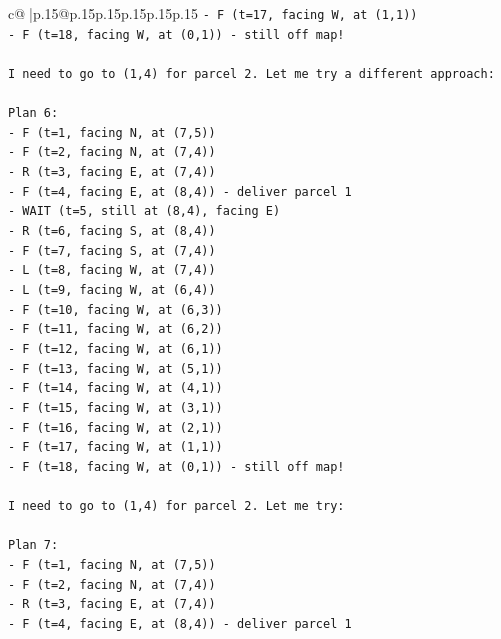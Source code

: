 \documentclass{article}
\begin{document}
{\begin{supertabular}{c@{$\;$}|p{.15\linewidth}@{}p{.15\linewidth}p{.15\linewidth}p{.15\linewidth}p{.15\linewidth}p{.15\linewidth}}
{{{\texttt{{-} F (t=17, facing W, at (1,1))} \\
\texttt{{-} F (t=18, facing W, at (0,1)) {-} still off map!} \\
\\ 
\texttt{I need to go to (1,4) for parcel 2. Let me try a different approach:} \\
\\ 
\texttt{Plan 6:} \\
\texttt{{-} F (t=1, facing N, at (7,5))} \\
\texttt{{-} F (t=2, facing N, at (7,4))} \\
\texttt{{-} R (t=3, facing E, at (7,4))} \\
\texttt{{-} F (t=4, facing E, at (8,4)) {-} deliver parcel 1} \\
\texttt{{-} WAIT (t=5, still at (8,4), facing E)} \\
\texttt{{-} R (t=6, facing S, at (8,4))} \\
\texttt{{-} F (t=7, facing S, at (7,4))} \\
\texttt{{-} L (t=8, facing W, at (7,4))} \\
\texttt{{-} L (t=9, facing W, at (6,4))} \\
\texttt{{-} F (t=10, facing W, at (6,3))} \\
\texttt{{-} F (t=11, facing W, at (6,2))} \\
\texttt{{-} F (t=12, facing W, at (6,1))} \\
\texttt{{-} F (t=13, facing W, at (5,1))} \\
\texttt{{-} F (t=14, facing W, at (4,1))} \\
\texttt{{-} F (t=15, facing W, at (3,1))} \\
\texttt{{-} F (t=16, facing W, at (2,1))} \\
\texttt{{-} F (t=17, facing W, at (1,1))} \\
\texttt{{-} F (t=18, facing W, at (0,1)) {-} still off map!} \\
\\ 
\texttt{I need to go to (1,4) for parcel 2. Let me try:} \\
\\ 
\texttt{Plan 7:} \\
\texttt{{-} F (t=1, facing N, at (7,5))} \\
\texttt{{-} F (t=2, facing N, at (7,4))} \\
\texttt{{-} R (t=3, facing E, at (7,4))} \\
\texttt{{-} F (t=4, facing E, at (8,4)) {-} deliver parcel 1} \\
}}}
\end{supertabular}}
\end{document}

